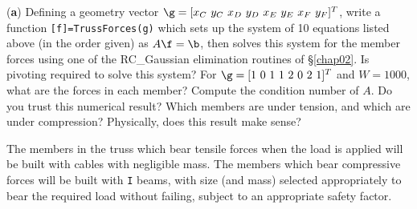 \begin{exercise}
\noindent ({\bf a}) Defining a geometry vector
$\g=[x_C\ y_C\ x_D\ y_D\ x_E\ y_E\ x_F\ y_F]^T$,
write a function {\tt [f]=TrussForces(g)} which
sets up the system of 10 equations listed above (in the order given)
as $A\f = \b$, then solves this system for the member
forces using one of the RC_Gaussian elimination routines of \S \ref{chap02}.  Is pivoting required to solve this system?
For $\g=[1\ 0\ 1\ 1\ 2\ 0\ 2\ 1]^T$ and
$W=1000$, what are the forces in each member?  Compute the
condition number of $A$.  Do you trust this numerical result?  Which
members are under tension, and which are under compression?
Physically, does this result make sense?
\end{exercise}

The members in the truss which bear
tensile forces when the load is applied will be built with cables with
negligible mass.  The members which bear compressive forces will be built with {\tt I} beams, with size (and
mass) selected appropriately to bear the required load without failing,
subject to an appropriate safety factor. \vskip0.1in

\def\TE{TE}
\def\KE{KE}
\def\PE{PE}
\def\DE{DE}
\def\alphad{{\boldsymbol{\alpha}}}
\def\thetad{{\pmb{\theta}}}
\def\xid{{\boldsymbol{\xi}}}

